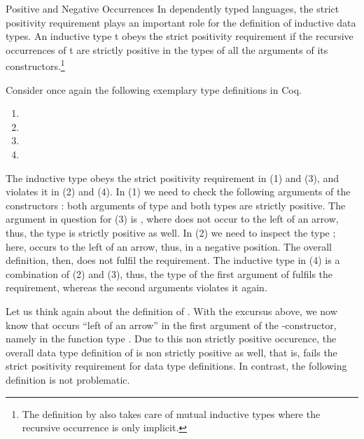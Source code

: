 \begin{excursus}{Positive and Negative Occurrences}
In dependently typed languages, the strict positivity requirement plays an important role for the definition of inductive data types.
An inductive type t obeys the strict positivity requirement if the recursive occurrences of t are strictly positive in the types of all the arguments of its constructors.\footnote{The definition by \citeauthor{blanqui2002inductivedatatype} also takes care of mutual inductive types where the recursive occurrence is only implicit.}

Consider once again the following exemplary type definitions in Coq.

\begin{enumerate}
\item[(1)] 
\item[(2)] 
\item[(3)] 
\item[(4)] 
\end{enumerate}

The inductive type  obeys the strict positivity requirement in (1) and (3), and violates it in (2) and (4).
In (1) we need to check the following arguments of the constructors : both arguments of type  and both types are strictly positive.
The argument in question for (3) is , where  does not occur to the left of an arrow, thus, the type is strictly positive as well.
In (2) we need to inspect the type ; here,  occurs to the left of an arrow, thus, in a negative position.
The overall definition, then, does not fulfil the requirement.
The inductive type in (4) is a combination of (2) and (3), thus, the type of the first argument of  fulfils the requirement, whereas the second arguments violates it again.
\end{excursus}

Let us think again about the definition of .
With the excursus above, we now know that  occurs ``left of an arrow''  in the first argument of the \--constructor, namely in the function type .
Due to this non strictly positive occurence, the overall data type definition of  is non strictly positive as well, that is, fails the strict positivity requirement for data type definitions.
In contrast, the following definition is not problematic.

